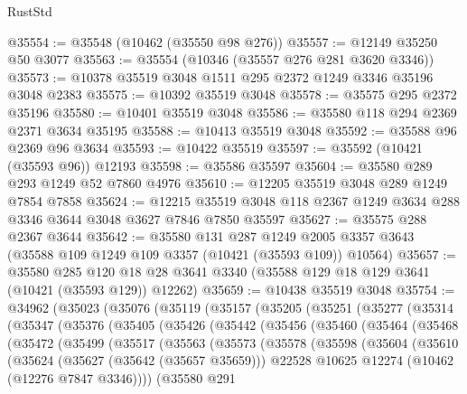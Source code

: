 \begin{lexlean}{RustStd}
\begin{coremodule}
@35554 := @35548 (@10462 (@35550 @98 @276))
@35557 := @12149 @35250 @50 @3077
@35563 := @35554 (@10346 (@35557 @276 @281 @3620 @3346))
@35573 := @10378 @35519 @3048 @1511 @295 @2372 @1249 @3346 @35196 @3048 @2383
@35575 := @10392 @35519 @3048
@35578 := @35575 @295 @2372 @35196
@35580 := @10401 @35519 @3048
@35586 := @35580 @118 @294 @2369 @2371 @3634 @35195
@35588 := @10413 @35519 @3048
@35592 := @35588 @96 @2369 @96 @3634
@35593 := @10422 @35519
@35597 := @35592 (@10421 (@35593 @96)) @12193
@35598 := @35586 @35597
@35604 := @35580 @289 @293 @1249 @52 @7860 @4976
@35610 := @12205 @35519 @3048 @289 @1249 @7854 @7858
@35624 := @12215 @35519 @3048 @118 @2367 @1249 @3634 @288 @3346 @3644 @3048 @3627 @7846 @7850 @35597
@35627 := @35575 @288 @2367 @3644
@35642 := @35580
    @131
    @287
    @1249
    @2005
    @3357
    @3643
    (@35588 @109 @1249 @109 @3357 (@10421 (@35593 @109)) @10564)
@35657 := @35580
    @285
    @120
    @18
    @28
    @3641
    @3340
    (@35588 @129 @18 @129 @3641 (@10421 (@35593 @129)) @12262)
@35659 := @10438 @35519 @3048
@35754 := @34962
    (@35023
      (@35076
        (@35119
          (@35157
            (@35205
              (@35251
                (@35277
                  (@35314
                    (@35347
                      (@35376
                        (@35405
                          (@35426
                            (@35442
                              (@35456
                                (@35460
                                  (@35464
                                    (@35468
                                      (@35472
                                        (@35499
                                          (@35517
                                            (@35563
                                              (@35573
                                                (@35578
                                                  (@35598
                                                    (@35604
                                                      (@35610
                                                        (@35624
                                                          (@35627 (@35642 (@35657 @35659)))
                                                          @22528
                                                          @10625
                                                          @12274
                                                          (@10462 (@12276 @7847 @3346))))
                                                      (@35580
                                                        @291

\end{coremodule}
\end{lexlean}

